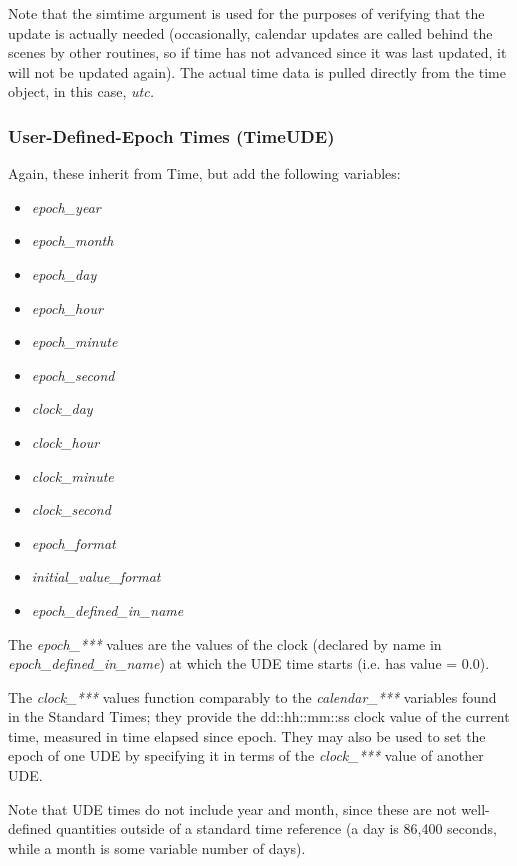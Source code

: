 Note that the simtime argument is used for the purposes of verifying
that the update is actually needed (occasionally, calendar updates are
called behind the scenes by other routines, so if time has not advanced
since it was last updated, it will not be updated again).  The actual
time data is pulled directly from the time object, in this case,
\textit{utc.  }




\subsubsection{User-Defined-Epoch Times (TimeUDE)}
Again, these inherit from Time, but add the following variables:


\begin{itemize}
\item {\itshape
epoch\_year}
\item {\itshape
epoch\_month}
\item {\itshape
epoch\_day}
\item {\itshape
epoch\_hour}
\item {\itshape
epoch\_minute}
\item {\itshape
epoch\_second}
\item {\itshape
clock\_day}
\item {\itshape
clock\_hour}
\item {\itshape
clock\_minute}
\item {\itshape
clock\_second}
\item {\itshape
epoch\_format}
\item {\itshape
initial\_value\_format}
\item {\itshape
epoch\_defined\_in\_name}
\end{itemize}
The \textit{epoch\_***} values are the values of the clock (declared by
name in \textit{epoch\_defined\_in\_name}) at which the UDE time starts
(i.e. has value = 0.0).

The \textit{clock\_*** }values function comparably to the
\textit{calendar\_*** }variables found in the Standard Times; they
provide the dd::hh::mm::ss clock value of the current time, measured in
time elapsed since epoch.  They may also be used to set the epoch of one
UDE by specifying it in terms of the \textit{clock\_***} value of another
UDE.

Note that UDE times do not include year and
month, since these are not well-defined quantities outside of a
standard time reference (a day is 86,400 seconds, while a month is some
variable number of days).

